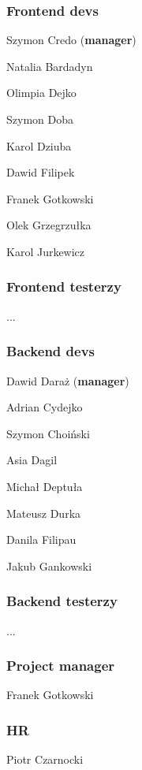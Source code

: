 \documentclass[]{report}
\begin{document}
\noindent\begin{minipage}[t]{0.32\textwidth}
    \subsubsection*{Frontend devs}

        Szymon Credo (\textbf{manager})
        
        Natalia Bardadyn
        
        Olimpia Dejko
        
        Szymon Doba
        
        Karol Dziuba
        
        Dawid Filipek

        Franek Gotkowski
        
        Olek Grzegrzułka
        
        Karol Jurkewicz

    \subsubsection*{Frontend testerzy}
        ...

\end{minipage}
\hfill
\begin{minipage}[t]{0.32\textwidth}
    \subsubsection*{Backend devs}
        Dawid Daraż (\textbf{manager})
        
        Adrian Cydejko
        
        Szymon Choiński
        
        Asia Dagil
        
        Michał Deptuła
        
        Mateusz Durka
        
        Danila Filipau
        
        Jakub Gankowski

    \subsubsection*{Backend testerzy}
        ...
    
\end{minipage}
\hfill
\begin{minipage}[t]{0.32\textwidth}
    \subsubsection*{Project manager}
        Franek Gotkowski
    \subsubsection*{HR}
        Piotr Czarnocki
    
\end{minipage}
\end{document}
